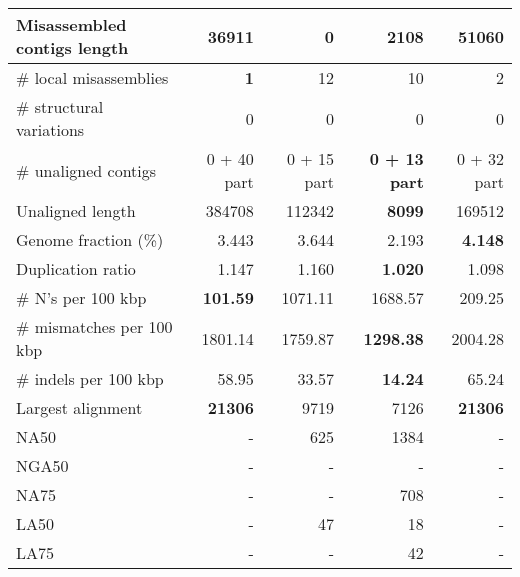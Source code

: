 \documentclass[12pt,a4paper]{article}
\begin{document}
\begin{table}[ht]
\begin{center}
\begin{tabular}{|l*{4}{|r}|}
Misassembled contigs length & 36911 & {\bf 0} & 2108 & 51060 \\ \hline
\# local misassemblies & {\bf 1} & 12 & 10 & 2 \\ \hline
\# structural variations & 0 & 0 & 0 & 0 \\ \hline
\# unaligned contigs & 0 + 40 part & 0 + 15 part & {\bf 0 + 13 part} & 0 + 32 part \\ \hline
Unaligned length & 384708 & 112342 & {\bf 8099} & 169512 \\ \hline
Genome fraction (\%) & 3.443 & 3.644 & 2.193 & {\bf 4.148} \\ \hline
Duplication ratio & 1.147 & 1.160 & {\bf 1.020} & 1.098 \\ \hline
\# N's per 100 kbp & {\bf 101.59} & 1071.11 & 1688.57 & 209.25 \\ \hline
\# mismatches per 100 kbp & 1801.14 & 1759.87 & {\bf 1298.38} & 2004.28 \\ \hline
\# indels per 100 kbp & 58.95 & 33.57 & {\bf 14.24} & 65.24 \\ \hline
Largest alignment & {\bf 21306} & 9719 & 7126 & {\bf 21306} \\ \hline
NA50 & - & 625 & 1384 & - \\ \hline
NGA50 & - & - & - & - \\ \hline
NA75 & - & - & 708 & - \\ \hline
LA50 & - & 47 & 18 & - \\ \hline
LA75 & - & - & 42 & - \\ \hline
\end{tabular}
\end{center}
\end{table}
\end{document}
